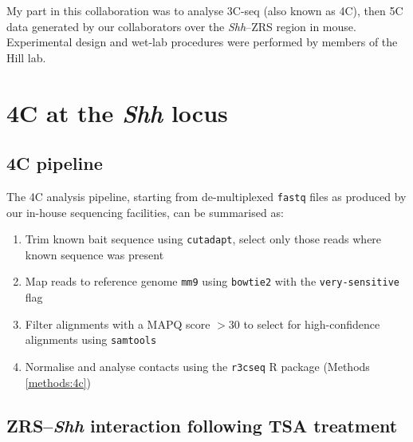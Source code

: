 \documentclass[a4paper,11pt,oneside]{book}
\begin{document}
My part in this collaboration was to analyse 3C-seq (also known as 4C), then 5C data generated by our collaborators over the \emph{Shh}--ZRS region in mouse. Experimental design and wet-lab procedures were performed by members of the Hill lab.

\section{4C at the \emph{Shh} locus}\label{sec:4cshh}
\subsection{4C pipeline}

The 4C analysis pipeline, starting from de-multiplexed \texttt{fastq} files as produced by our in-house sequencing facilities, can be summarised as:

\begin{enumerate}
\item Trim known bait sequence using \texttt{cutadapt},\cite{cutadapt} select only those reads where known sequence was present
\item Map reads to reference genome \texttt{mm9} using \texttt{bowtie2}\cite{Langmead2012} with the \texttt{very-sensitive} flag
\item Filter alignments with a MAPQ score $>30$ to select for high-confidence alignments using \texttt{samtools}\cite{Li2009}
\item Normalise and analyse contacts using the \texttt{r3cseq} R package (Methods \ref{methods:4c})
\end{enumerate}


\subsection{ZRS--\emph{Shh} interaction following TSA treatment}
\end{document}
